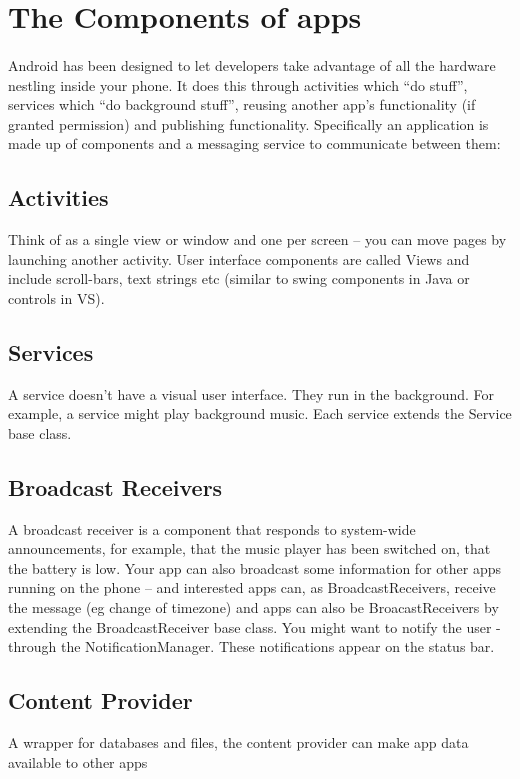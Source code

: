 \documentclass[12pt, a4paper, twoside]{book}
\begin{document}
\section{The Components of apps}
\paragraph{} Android has been designed to let developers take advantage of all the hardware nestling inside your phone. It does this through activities which “do stuff”, services which “do background stuff”,  reusing another app’s functionality (if granted permission) and publishing functionality. Specifically an application is made up of components and a messaging service to communicate between them:

\subsection{Activities}
Think of as a single view or window and one per screen – you can move pages by launching another activity. User interface components are called Views and include scroll-bars, text strings etc (similar to swing components in Java or controls in VS).

\subsection{Services}
A service doesn't have a visual user interface. They run in the background. For example, a service might play background music. Each service extends the Service base class.

\subsection{Broadcast Receivers}
A broadcast receiver is a component that responds to system-wide announcements, for example, that the music player has been switched on, that the battery is low. Your app can also broadcast some information for other apps running on the phone – and interested apps can, as BroadcastReceivers, receive the message (eg change of timezone) and apps can also be BroacastReceivers by extending the BroadcastReceiver base class. You might want to notify the user - through the NotificationManager. These notifications appear on the status bar.

\subsection{Content Provider}
A wrapper for databases and files, the content provider can make app data available to other apps
\end{document}
